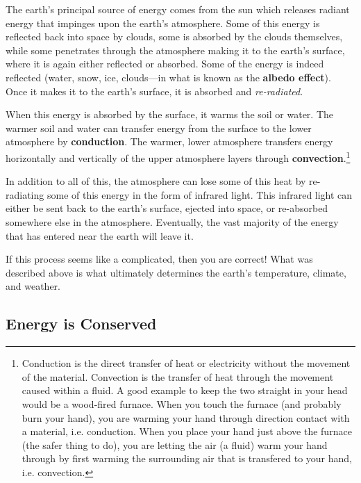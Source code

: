     The earth's principal source of energy comes from the sun which releases radiant energy that impinges upon the earth's atmosphere.  Some of this energy is reflected back into space by clouds, some is absorbed by the clouds themselves, while some penetrates through the atmosphere making it to the earth's surface, where it is again either reflected or absorbed. Some of the energy is indeed reflected (water, snow, ice, clouds---in what is known as the \textbf{albedo effect}). Once it makes it to the earth's surface, it is absorbed and \emph{re-radiated}.

    When this energy is absorbed by the surface, it warms the soil or water. The warmer soil and water can transfer energy from the surface to the lower atmosphere by \textbf{conduction}. The warmer, lower atmosphere transfers energy horizontally and vertically of the upper atmosphere layers through \textbf{convection}.\footnote{
        Conduction is the direct transfer of heat or electricity without the movement of the material. Convection is the transfer of heat through the movement caused within a fluid. A good example to keep the two straight in your head would be a wood-fired furnace. When you touch the furnace (and probably burn your hand), you are warming your hand through direction contact with a material, i.e. conduction. When you place your hand just above the furnace (the safer thing to do), you are letting the air (a fluid) warm your hand through by first warming the surrounding air that is transfered to your hand, i.e. convection.
        } 
				
    In addition to all of this, the atmosphere can lose some of this heat by re-radiating some of this energy in the form of infrared light. This infrared light can either be sent back to the earth's surface, ejected into space, or re-absorbed somewhere else in the atmosphere. Eventually, the vast majority of the energy that has entered near the earth will leave it. 

    If this process seems like a complicated, then you are correct! What was described above is what ultimately determines the earth's temperature, climate, and weather.
		
\subsection{Energy is Conserved}

